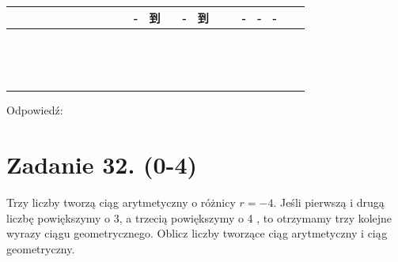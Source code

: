 \documentclass[10pt]{article}
\begin{document}
\begin{center}
\begin{tabular}{|c|c|c|c|c|c|c|c|c|c|c|c|c|c|c|c|c|c|c|c|c|c|c|}
\hline
 &  &  &  &  &  &  &  &  &  &  & - & 到 &  & - & 到 &  &  & - & - & - &  &  \\
\hline
 &  &  &  &  &  &  &  &  &  &  &  &  &  &  &  &  &  &  &  &  &  &  \\
\hline
 &  &  &  &  &  &  &  &  &  &  &  &  &  &  &  &  &  &  &  &  &  &  \\
\hline
 &  &  &  &  &  &  &  &  &  &  &  &  &  &  &  &  &  &  &  &  &  &  \\
\hline
 &  &  &  &  &  &  &  &  &  &  &  &  &  &  &  &  &  &  &  &  &  &  \\
\hline
 &  &  &  &  &  &  &  &  &  &  &  &  &  &  &  &  &  &  &  &  &  &  \\
\hline
 &  &  &  &  &  &  &  &  &  &  &  &  &  &  &  &  &  &  &  &  &  &  \\
\hline
 &  &  &  &  &  &  &  &  &  &  &  &  &  &  &  &  &  &  &  &  &  &  \\
\hline
 &  &  &  &  &  &  &  &  &  &  &  &  &  &  &  &  &  &  &  &  &  &  \\
\hline
 &  &  &  &  &  &  &  &  &  &  &  &  &  &  &  &  &  &  &  &  &  &  \\
\hline
 &  &  &  &  &  &  &  &  &  &  &  &  &  &  &  &  &  &  &  &  &  &  \\
\hline
 &  &  &  &  &  &  &  &  &  &  &  &  &  &  &  &  &  &  &  &  &  &  \\
\hline
 &  &  &  &  &  &  &  &  &  &  &  &  &  &  &  &  &  &  &  &  &  &  \\
\hline
 &  &  &  &  &  &  &  &  &  &  &  &  &  &  &  &  &  &  &  &  &  &  \\
\hline
 &  &  &  &  &  &  &  &  &  &  &  &  &  &  &  &  &  &  &  &  &  &  \\
\hline
 &  &  &  &  &  &  &  &  &  &  &  &  &  &  &  &  &  &  &  &  &  &  \\
\hline
\end{tabular}
\end{center}

Odpowiedź: \(\qquad\)

\section*{Zadanie 32. (0-4)}
Trzy liczby tworzą ciąg arytmetyczny o różnicy \(r=-4\). Jeśli pierwszą i drugą liczbę powiększymy o 3, a trzecią powiększymy o 4 , to otrzymamy trzy kolejne wyrazy ciągu geometrycznego. Oblicz liczby tworzące ciąg arytmetyczny i ciąg geometryczny.
\end{document}
